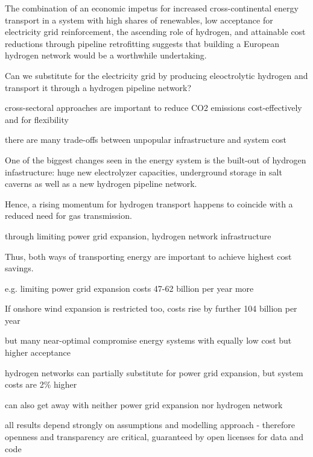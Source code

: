 The combination of an economic impetus for increased cross-continental energy
transport in a system with high shares of renewables, low acceptance for
electricity grid reinforcement, the ascending role of hydrogen, and attainable
cost reductions through pipeline retrofitting suggests that building a European
hydrogen network would be a worthwhile undertaking.

Can we substitute for the electricity grid by producing eleoctrolytic hydrogen
and transport it through a hydrogen pipeline network?


cross-sectoral approaches are important to reduce CO2 emissions cost-effectively and for flexibility

there are many trade-offs between unpopular infrastructure and system cost

One of the biggest changes seen in the energy system is the built-out of
hydrogen infastructure: huge new electrolyzer capacities, underground storage in
salt caverns as well as a new hydrogen pipeline network.

Hence, a rising momentum for hydrogen transport happens to coincide with a
reduced need for gas transmission.

through limiting power grid expansion, hydrogen network infrastructure

Thus, both ways of transporting energy are important to achieve highest
cost savings.

e.g. limiting power grid expansion costs 47-62 billion per year more

If onshore wind expansion is restricted too, costs rise by further 104 billion per year

but many near-optimal compromise energy systems with equally low cost but higher acceptance

hydrogen networks can partially substitute for power grid expansion, but system costs are
2\% higher

can also get away with neither power grid expansion nor hydrogen network

all results depend strongly on assumptions and modelling approach
- therefore openness and transparency are critical, guaranteed by open licenses for data and code